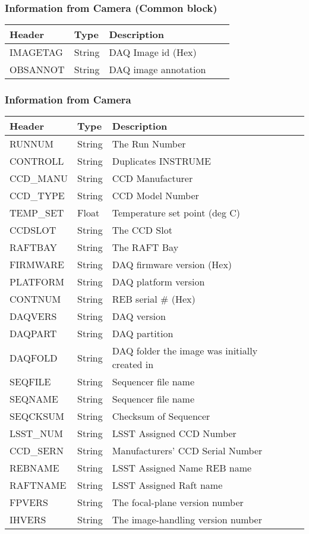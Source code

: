 \subsubsection{Information from Camera (Common block)}
\begin{tabular}{l l l l l}

\hline
Header & Type & Description \\
\hline
IMAGETAG & String & DAQ Image id (Hex) \\
OBSANNOT & String & DAQ image annotation \\
\hline
\end{tabular}


\subsubsection{Information from Camera}
\begin{tabular}{l l l l l}

\hline
Header & Type & Description \\
\hline
RUNNUM & String & The Run Number \\
CONTROLL & String & Duplicates INSTRUME \\
CCD\_MANU & String & CCD Manufacturer \\
CCD\_TYPE & String & CCD Model Number \\
TEMP\_SET & Float & Temperature set point (deg C) \\
CCDSLOT & String & The CCD Slot \\
RAFTBAY & String & The RAFT Bay \\
FIRMWARE & String & DAQ firmware version (Hex) \\
PLATFORM & String & DAQ platform version \\
CONTNUM & String & REB serial \# (Hex) \\
DAQVERS & String & DAQ version \\
DAQPART & String & DAQ partition \\
DAQFOLD & String & DAQ folder the image was initially created in \\
SEQFILE & String & Sequencer file name \\
SEQNAME & String & Sequencer file name \\
SEQCKSUM & String & Checksum of Sequencer \\
LSST\_NUM & String & LSST Assigned CCD Number \\
CCD\_SERN & String & Manufacturers’ CCD Serial Number \\
REBNAME & String & LSST Assigned Name REB name \\
RAFTNAME & String & LSST Assigned Raft name \\
FPVERS & String & The focal-plane version number \\
IHVERS & String & The image-handling version number \\
\hline
\end{tabular}


